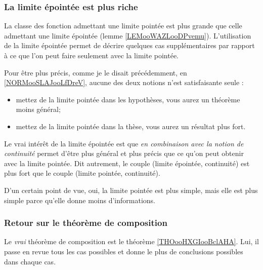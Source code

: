 \subsubsection{La limite épointée est plus riche}

La classe des fonction admettant une limite pointée est plus grande que celle admettant une limite épointée (lemme \ref{LEMooWAZLooDPvemu}). L'utilisation de la limite épointée permet de décrire quelques cas supplémentaires par rapport à ce que l'on peut faire seulement avec la limite pointée.

Pour être plus précis, comme je le disait précédemment, en \ref{NORMooSLAJooLfDreV}, aucune des deux notions n'est satisfaisante seule :
\begin{itemize}
	\item mettez de la limite pointée dans les hypothèses, vous aurez un théorème moins général;
	\item mettez de la limite pointée dans la thèse, vous aurez un résultat plus fort.
\end{itemize}

Le vrai intérêt de la limite épointée est que \emph{en combinaison avec la notion de continuité} permet d'être plus général et plus précis que ce qu'on peut obtenir avec la limite pointée. Dit autrement, le couple (limite épointée, continuité) est plus fort que le couple (limite pointée, continuité).

D'un certain point de vue, oui, la limite pointée est plus simple, mais elle est plus simple parce qu'elle donne moins d'informations.

\subsubsection{Retour sur le théorème de composition}

Le \emph{vrai} théorème de composition est le théorème \ref{THOooHXGIooBclAHA}. Lui, il passe en revue tous les cas possibles et donne le plus de conclusions possibles dans chaque cas.

